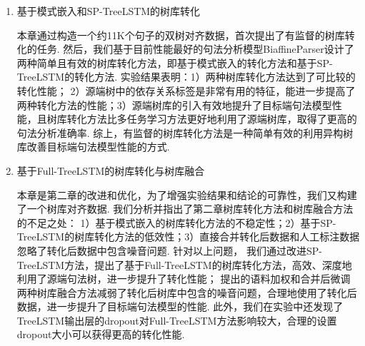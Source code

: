 \begin{enumerate}
      \item 基于模式嵌入和SP-TreeLSTM的树库转化

            本章通过构造一个约11K个句子的双树对齐数据，首次提出了有监督的树库转化的任务. 然后，我们基于目前性能最好的句法分析模型BiaffineParser设计了两种简单且有效的树库转化方法，即基于模式嵌入的转化方法和基于SP-TreeLSTM的转化方法. 实验结果表明：1）两种树库转化方法达到了可比较的转化性能； 2）源端树中的依存关系标签是非常有用的特征，能进一步提高了两种转化方法的性能；3）源端树库的引入有效地提升了目标端句法模型性能，且树库转化方法比多任务学习方法更好地利用了源端树库，取得了更高的句法分析准确率. 综上，有监督的树库转化方法是一种简单有效的利用异构树库改善目标端句法模型性能的方式.




      \item 基于Full-TreeLSTM的树库转化与树库融合

            本章是第二章的改进和优化，为了增强实验结果和结论的可靠性，我们又构建了一个树库对齐数据.
            我们分析并指出了第二章树库转化方法和树库融合方法的不足之处：
            1）基于模式嵌入的树库转化方法的不稳定性；2）基于SP-TreeLSTM的树库转化方法的低效性；3）直接合并转化后数据和人工标注数据忽略了转化后数据中包含噪音问题.
            针对以上问题，
            我们通过改进SP-TreeLSTM方法，提出了基于Full-TreeLSTM的树库转化方法，高效、深度地利用了源端句法树，进一步提升了转化性能；
            提出的语料加权和合并后微调两种树库融合方法减弱了转化后树库中包含的噪音问题，合理地使用了转化后数据，进一步提升了目标端句法模型的性能.
            此外，我们在实验中还发现了TreeLSTM输出层的dropout对Full-TreeLSTM方法影响较大，合理的设置dropout大小可以获得更高的转化性能.


\end{enumerate}
